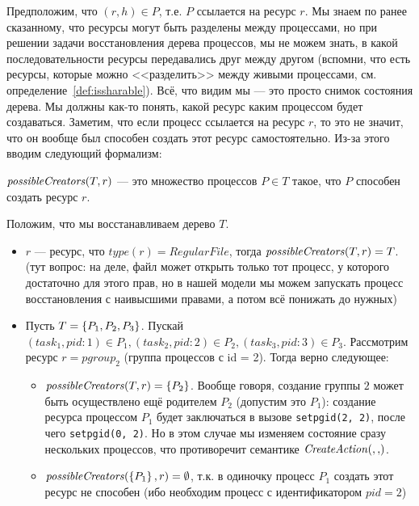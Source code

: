 Предположим, что $(r, h) \in P$, т.е. $P$ ссылается на ресурс $r$. Мы знаем по ранее сказанному, что ресурсы могут быть разделены между процессами, но при решении задачи восстановления дерева процессов, мы не можем знать, в какой последовательности ресурсы передавались друг между другом (вспомни, что есть ресурсы, которые можно <<разделить>> между живыми процессами, см. определение~\ref{def:issharable}). Всё, что видим мы --- это просто снимок состояния дерева. Мы должны как-то понять, какой ресурс каким процессом будет создаваться. Заметим, что если процесс ссылается на ресурс $r$, то это не значит, что он вообще был способен создать этот ресурс самостоятельно. Из-за этого вводим следующий формализм:

\begin{defn}
\label{def:possiblecrtrs}
$\text{\textit{possibleCreators}}(T, r)$ --- это множество процессов $P \in T$ такое, что $P$ способен создать ресурс $r$.
\end{defn}

\begin{exmp}
Положим, что мы восстанавливаем дерево $T$.
\begin{itemize}
	\item $r$ --- ресурс, что $type(r) = RegularFile$, тогда $\text{\textit{possibleCreators}}(T, r) = T$. (тут вопрос: на деле, файл может открыть только тот процесс, у которого достаточно для этого прав, но в нашей модели мы можем запускать процесс восстановления с наивысшими правами, а потом всё понижать до нужных)

	\item Пусть $T = \left\lbrace P_1, P_2, P_3 \right\rbrace$. Пускай $(task_1, pid:1) \in P_1, (task_2, pid:2) \in P_2, (task_3, pid:3) \in P_3$. Рассмотрим ресурс $r = pgroup_2$ (группа процессов с id = 2). Тогда верно следующее:
	\begin{itemize}
		\item $\text{\textit{possibleCreators}}(T, r) = \left\lbrace P_2 \right\rbrace$. Вообще говоря, создание группы $2$ может быть осуществлено ещё родителем $P_2$ (допустим это $P_1$): создание ресурса процессом $P_1$ будет заключаться в вызове \texttt{setpgid(2, 2)}, после чего \texttt{setpgid(0, 2)}. Но в этом случае мы изменяем состояние сразу нескольких процессов, что противоречит семантике $\crcreate{}{}$.
		\item $\text{\textit{possibleCreators}}(\left\lbrace P_1 \right\rbrace, r) = \emptyset$, т.к. в одиночку процесс $P_1$ создать этот ресурс не способен (ибо необходим процесс с идентификатором $pid = 2$)
	\end{itemize}
\end{itemize}
\end{exmp}


